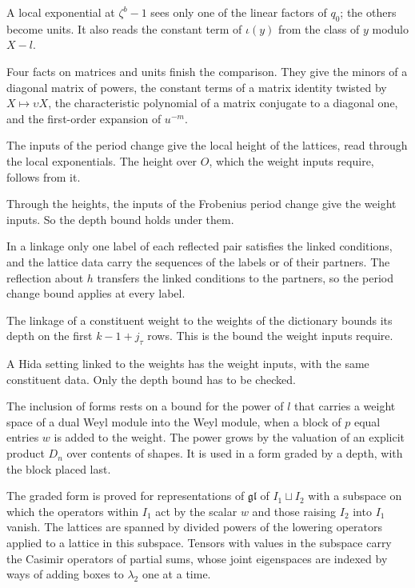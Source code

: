 A local exponential at $\zeta^b-1$ sees only one of the linear factors of $q_0$; the others become units.
It also reads the constant term of $\iota(y)$ from the class of $y$ modulo $X-l$.

Four facts on matrices and units finish the comparison. They give the minors of a diagonal matrix of
powers, the constant terms of a matrix identity twisted by $X\mapsto\upsilon X$, the characteristic
polynomial of a matrix conjugate to a diagonal one, and the first-order expansion of $u^{-m}$.

The inputs of the period change give the local height of the lattices, read through the local
exponentials. The height over $O$, which the weight inputs require, follows from it.

Through the heights, the inputs of the Frobenius period change give the weight inputs. So the depth
bound holds under them.

In a linkage only one label of each reflected pair satisfies the linked conditions, and the lattice data
carry the sequences of the labels or of their partners. The reflection about $h$ transfers the linked
conditions to the partners, so the period change bound applies at every label.

The linkage of a constituent weight to the weights of the dictionary bounds its depth on the first
$k-1+j_\tau$ rows. This is the bound the weight inputs require.

A Hida setting linked to the weights has the weight inputs, with the same constituent data. Only the
depth bound has to be checked.

The inclusion of forms rests on a bound for the power of $l$ that carries a weight space of a dual Weyl
module into the Weyl module, when a block of $p$ equal entries $w$ is added to the weight. The power
grows by the valuation of an explicit product $D_n$ over contents of shapes. It is used in a form graded
by a depth, with the block placed last.

The graded form is proved for representations of $\mathfrak{gl}$ of $I_1\sqcup I_2$ with a subspace on
which the operators within $I_1$ act by the scalar $w$ and those raising $I_2$ into $I_1$ vanish. The
lattices are spanned by divided powers of the lowering operators applied to a lattice in this subspace.
Tensors with values in the subspace carry the Casimir operators of partial sums, whose joint eigenspaces
are indexed by ways of adding boxes to $\lambda_2$ one at a time.

